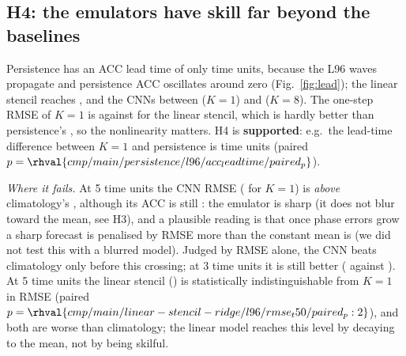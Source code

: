 \subsection{H4: the emulators have skill far beyond the baselines}
Persistence has an ACC lead time of only  time units, because the L96 waves propagate and persistence ACC oscillates around zero (Fig.~\ref{fig:lead}); the linear stencil reaches , and the CNNs between  ($K{=}1$) and  ($K{=}8$). The one-step RMSE of $K{=}1$ is  against  for the linear stencil, which is hardly better than persistence's , so the nonlinearity matters. H4 is \textbf{supported}: e.g.\ the lead-time difference between $K{=}1$ and persistence is  time units (paired $p=\rhval{cmp/main/persistence/l96/acc_leadtime/paired_p}$).

\textit{Where it fails.} At 5 time units the CNN RMSE ( for $K{=}1$) is \emph{above} climatology's , although its ACC is still : the emulator is sharp (it does not blur toward the mean, see H3), and a plausible reading is that once phase errors grow a sharp forecast is penalised by RMSE more than the constant mean is (we did not test this with a blurred model). Judged by RMSE alone, the CNN beats climatology only before this crossing; at 3 time units it is still better ( against ). At 5 time units the linear stencil () is statistically indistinguishable from $K{=}1$ in RMSE (paired $p=\rhval{cmp/main/linear-stencil-ridge/l96/rmse_t50/paired_p:2}$), and both are worse than climatology; the linear model reaches this level by decaying to the mean, not by being skilful.

